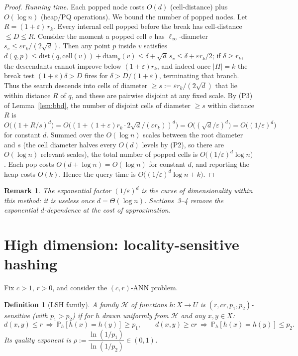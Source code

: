 \documentclass{amsart}
\newtheorem{definition}{Definition}
\newtheorem{remark}{Remark}
\renewcommand{\Pr}{\mathbb{P}}
\newcommand{\eps}{\varepsilon}
\begin{document}
\begin{proof}
\emph{Running time.}  Each popped node costs $O(d)$ (cell-distance) plus $O(\log n)$
(heap/PQ operations).  We bound the number of popped nodes.  Let $R=(1+\eps)\,r_k$.
Every internal cell popped before the break has cell-distance $\le D\le R$.  Consider
the moment a popped cell $v$ has $\ell_\infty$-diameter $s_v\le \eps r_k/(2\sqrt d)$.
Then any point $p$ inside $v$ satisfies $d(q,p)\le \mathrm{dist}(q,\mathrm{cell}(v)) +
\mathrm{diam}_p(v)\le \delta+\sqrt d\,s_v\le \delta+\eps r_k/2$; if $\delta\ge r_k$,
the descendants cannot improve below $(1+\eps)r_k$, and indeed once $|H|=k$ the break
test $(1+\eps)\delta>D$ fires for $\delta>D/(1+\eps)$, terminating that branch.  Thus
the search descends into cells of diameter $\ge s:=\eps r_k/(2\sqrt d)$ that lie within
distance $R$ of $q$, and these are pairwise disjoint at any fixed scale.  By (P3) of
Lemma~\ref{lem:bbd}, the number of disjoint cells of diameter $\ge s$ within distance
$R$ is $O\big((1+R/s)^d\big)=O\big((1+ (1+\eps)r_k\cdot 2\sqrt d/(\eps r_k))^d\big)
=O\big((\sqrt d/\eps)^d\big)=O\big((1/\eps)^d\big)$ for constant $d$.  Summed over the
$O(\log n)$ scales between the root diameter and $s$ (the cell diameter halves every
$O(d)$ levels by (P2), so there are $O(\log n)$ relevant scales), the total number of
popped cells is $O\big((1/\eps)^d\log n\big)$.  Each pop costs $O(d+\log n)=O(\log n)$
for constant $d$, and reporting the heap costs $O(k)$.  Hence the query time is
$O\big((1/\eps)^d\log n+k\big)$.
\end{proof}

\begin{remark}
The exponential factor $(1/\eps)^d$ is the curse of dimensionality \emph{within this
method}: it is useless once $d=\Theta(\log n)$.  Sections~3--4 remove the exponential
$d$-dependence at the cost of approximation.
\end{remark}

\section{High dimension: locality-sensitive hashing}

Fix $c>1$, $r>0$, and consider the $(c,r)$-ANN problem.

\begin{definition}[LSH family]\label{def:lsh}
A family $\mathcal H$ of functions $h:X\to U$ is \emph{$(r,cr,p_1,p_2)$-sensitive}
(with $p_1>p_2$) if for $h$ drawn uniformly from $\mathcal H$ and any $x,y\in X$:
\[
d(x,y)\le r \ \Rightarrow\ \Pr_h[h(x)=h(y)]\ge p_1,
\qquad
d(x,y)\ge cr \ \Rightarrow\ \Pr_h[h(x)=h(y)]\le p_2 .
\]
Its \emph{quality exponent} is $\rho:=\dfrac{\ln(1/p_1)}{\ln(1/p_2)}\in(0,1)$.
\end{definition}
\end{document}
